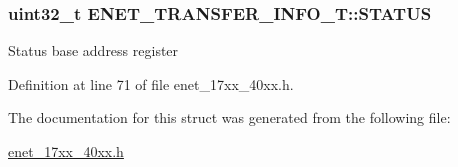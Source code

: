 \subsubsection[{\texorpdfstring{S\+T\+A\+T\+US}{STATUS}}]{ uint32\+\_\+t E\+N\+E\+T\+\_\+\+T\+R\+A\+N\+S\+F\+E\+R\+\_\+\+I\+N\+F\+O\+\_\+\+T\+::\+S\+T\+A\+T\+US}\hypertarget{structENET__TRANSFER__INFO__T_ae72bffa37688d592667997f276ff28e2}{}\label{structENET__TRANSFER__INFO__T_ae72bffa37688d592667997f276ff28e2}
Status base address register 

Definition at line 71 of file enet\+\_\+17xx\+\_\+40xx.\+h.



The documentation for this struct was generated from the following file\+:\begin{DoxyCompactItemize}
\item 
\hyperlink{enet__17xx__40xx_8h}{enet\+\_\+17xx\+\_\+40xx.\+h}\end{DoxyCompactItemize}
